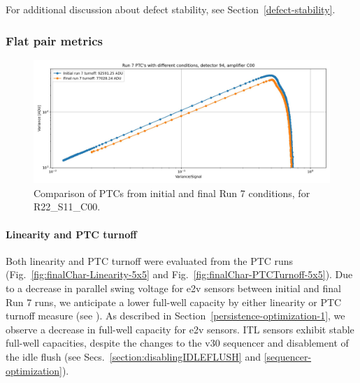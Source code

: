 For additional discussion about defect stability, see Section~\ref{defect-stability}.

\clearpage
\subsubsection{Flat pair metrics}

\begin{figure}[ht]
    \centering
    \includegraphics[width=0.7\linewidth]{figures/finalCharacterization/run7PTCsToDate(3).jpg}
    \caption{Comparison of PTCs from initial and final Run 7 conditions, for R22\_S11\_C00.}
    \label{fig:finalChar-PTCComparison}
\end{figure}
\clearpage

\paragraph{Linearity and PTC turnoff}\label{final-linearity-and-ptc-turnoff}

Both linearity and PTC turnoff were evaluated from the PTC runs (Fig.~\ref{fig:finalChar-Linearity-5x5} and Fig.~\ref{fig:finalChar-PTCTurnoff-5x5}). Due to a decrease in parallel swing voltage for e2v sensors between initial and final Run 7 runs, we anticipate a lower full-well capacity by either linearity or PTC turnoff measure (see \cite{2001sccd.book.....J}). As described in Section~\ref{persistence-optimization-1}, we observe a decrease in full-well capacity for e2v sensors. ITL sensors exhibit stable full-well capacities, despite the changes to the v30 sequencer and disablement of the idle flush (see Secs.~\ref{section:disablingIDLEFLUSH} and \ref{sequencer-optimization}).

